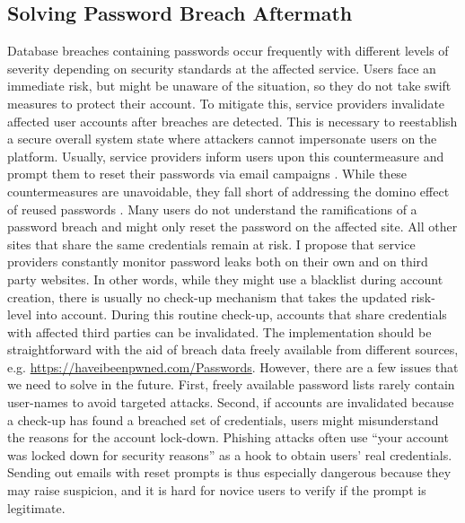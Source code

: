 \subsection{Solving Password Breach Aftermath}
Database breaches containing passwords occur frequently with different levels of severity depending on security standards at the affected service. 
Users face an immediate risk, but might be unaware of the situation, so they do not take swift measures to protect their account. 
To mitigate this, service providers invalidate affected user accounts after breaches are detected. This is necessary to reestablish a secure overall system state where attackers cannot impersonate users on the platform. Usually, service providers inform users upon this countermeasure and prompt them to reset their passwords via email campaigns \cite{Huh2017TooBusy}. 
While these countermeasures are unavoidable, they fall short of addressing the domino effect of reused passwords \cite{Ives2004DominoEffectReuse}. Many users do not understand the ramifications of a password breach and might only reset the password on the affected site. All other sites that share the same credentials remain at risk. 
I propose that service providers constantly monitor password leaks both on their own and on third party websites. In other words, while they might use a blacklist during account creation, there is usually no check-up mechanism that takes the updated risk-level into account. During this routine check-up, accounts that share credentials with affected third parties can be invalidated. The implementation should be straightforward with the aid of breach data freely available from different sources, e.g. \url{https://haveibeenpwned.com/Passwords}. 
However, there are a few issues that we need to solve in the future. First, freely available password lists rarely contain user-names to avoid targeted attacks. Second, if accounts are invalidated because a check-up has found a breached set of credentials, users might misunderstand the reasons for the account lock-down. Phishing attacks often use ``your account was locked down for security reasons'' as a hook to obtain users' real credentials. Sending out emails with reset prompts is thus especially dangerous because they may raise suspicion, and it is hard for novice users to verify if the prompt is legitimate.

